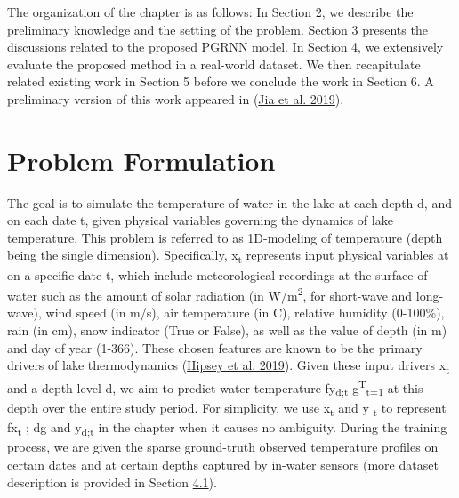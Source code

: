 \documentclass[book.tex]{subfiles}
\begin{document}
The organization of the chapter is as follows: In Section 2, we describe
the preliminary knowledge and the setting of the problem. Section 3
presents the discussions related to the proposed PGRNN model. In Section
4, we extensively evaluate the proposed method in a real-world dataset.
We then recapitulate related existing work in Section 5 before we
conclude the work in Section 6. A preliminary version of this work
appeared in (\protect\hyperlink{page23}{Jia et al. 2019}).


\section{Problem Formulation}

The goal is to simulate the temperature of water in the lake at each
depth d, and on each date t, given physical variables governing the
dynamics of lake temperature. This problem is referred to as 1D-modeling
of temperature (depth being the single dimension). Specifically,
x\textsubscript{t} represents input physical variables at on a
specific date t, which include meteorological recordings at the
surface of water such as the amount of solar radiation (in
W/m\textsuperscript{2}, for short-wave and long-wave), wind speed (in
m/s), air temperature (in C), relative humidity (0-100\%), rain (in cm),
snow indicator (True or False), as well as the value of depth (in m) and
day of year (1-366). These chosen features are known to be the primary
drivers of lake thermodynamics (\protect\hyperlink{page23}{Hipsey et al.
2019}). Given these input drivers x\textsubscript{t} and a depth level
d, we aim to predict water temperature fy\textsubscript{d;t}
g\textsuperscript{T}\textsubscript{t=1} at this depth over the entire
study period. For simplicity, we use x\textsubscript{t} and y
\textsubscript{t} to represent fx\textsubscript{t} ; dg and
y\textsubscript{d;t} in the chapter when it causes no ambiguity. During
the training process, we are given the sparse ground-truth observed
temperature profiles on certain dates and at certain depths
captured by in-water sensors (more dataset description is provided in
Section \protect\hyperlink{page10}{4.1}).




\end{document}
